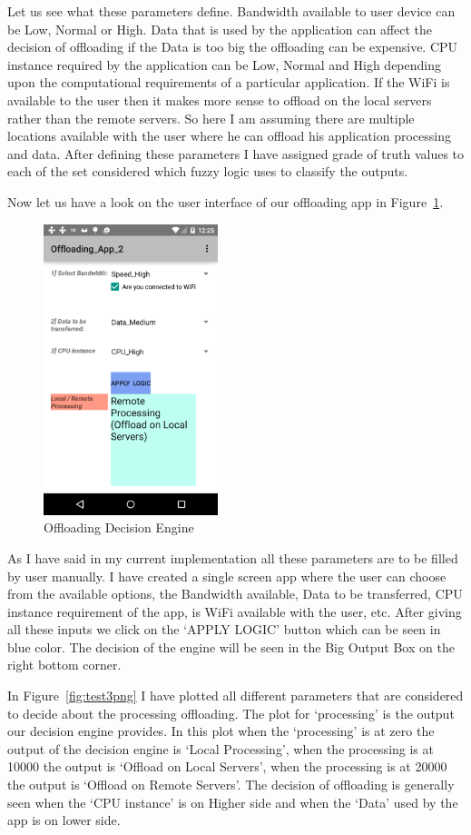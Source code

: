 \documentclass{article}
\begin{document}
Let us see what these parameters define. Bandwidth available to user device can be Low, Normal or High. Data that is used by the application can affect the decision of offloading if the Data is too big the offloading can be expensive. CPU instance required by the application can be Low, Normal and High depending upon the computational requirements of a particular application.
If the WiFi is available to the user then it makes more sense to offload on the local servers rather than the remote servers. So here I am assuming there are multiple locations available with the user where he can offload his application processing and data. After defining these parameters I have assigned grade of truth values to each of the set considered which fuzzy logic uses to classify the outputs.\par
Now let us have a look on the user interface of our offloading app in Figure~\ref{fig:offloading_Local_Server}.
\begin{figure}[h]
  \centering
  \includegraphics[width=2in]{offloading_Local_Server.png}
  \caption{Offloading Decision Engine}
  \label{fig:offloading_Local_Server}
\end{figure}
As I have said in my current implementation all these parameters are to be filled by user manually. I have created a single screen app where the user can choose from the available options, the Bandwidth available, Data to be transferred, CPU instance requirement of the app, is WiFi available with the user, etc. After giving all these inputs we click on the `APPLY LOGIC' button which can be seen in blue color. The decision of the engine will be seen in the Big Output Box on the right bottom corner.\par
In Figure~\ref{fig:test3png} I have plotted all different parameters that are considered to decide about the processing offloading. The plot for `processing' is the output our decision engine provides. In this plot when the `processing' is at zero the output of the decision engine is `Local Processing', when the processing is at 10000 the output is `Offload on Local Servers', when the processing is at 20000 the output is `Offload on Remote Servers'. The decision of offloading is generally seen when the `CPU instance' is on Higher side and when the `Data' used by the app is on lower side.
\end{document}
